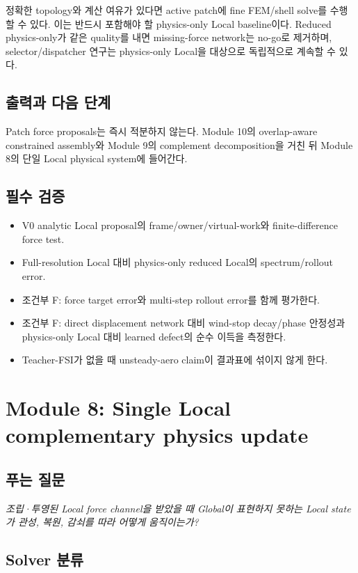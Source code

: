\documentclass[11pt,a4paper]{article}
\begin{document}
정확한 topology와 계산 여유가 있다면 active patch에 fine FEM/shell solve를 수행할 수 있다.
이는 반드시 포함해야 할 physics-only Local baseline이다.
Reduced physics-only가 같은 quality를 내면 missing-force network는 no-go로 제거하며,
selector/dispatcher 연구는 physics-only Local을 대상으로 독립적으로 계속할 수 있다.

\subsection*{출력과 다음 단계}

Patch force proposals는 즉시 적분하지 않는다.
Module 10의 overlap-aware constrained assembly와 Module 9의 complement decomposition을 거친 뒤
Module 8의 단일 Local physical system에 들어간다.

\subsection*{필수 검증}

\begin{itemize}[leftmargin=1.5em]
  \item V0 analytic Local proposal의 frame/owner/virtual-work와 finite-difference force test.
  \item Full-resolution Local 대비 physics-only reduced Local의 spectrum/rollout error.
  \item 조건부 F: force target error와 multi-step rollout error를 함께 평가한다.
  \item 조건부 F: direct displacement network 대비 wind-stop decay/phase 안정성과
  physics-only Local 대비 learned defect의 순수 이득을 측정한다.
  \item Teacher-FSI가 없을 때 unsteady-aero claim이 결과표에 섞이지 않게 한다.
\end{itemize}

\section{Module 8: Single Local complementary physics update}

\subsection*{푸는 질문}

\emph{조립·투영된 Local force channel을 받았을 때 Global이 표현하지 못하는 Local state가
관성, 복원, 감쇠를 따라 어떻게 움직이는가?}

\subsection*{Solver 분류}
\end{document}
